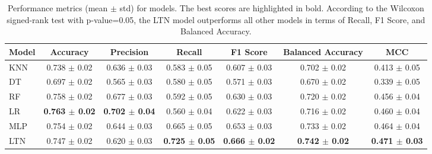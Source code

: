 \begin{table*}[]
    \centering
    \begin{adjustbox}{max width=\textwidth}
        \begin{tabular}{|l|c|c|c|c|c|c|}
            \hline
            \textbf{Model} & \textbf{Accuracy} & \textbf{Precision} & \textbf{Recall} & \textbf{F1 Score} & \textbf{Balanced Accuracy} & \textbf{MCC} \\
            \hline
            \gls{KNN}  & 0.738 $\pm$  0.02 & 0.636 $\pm$  0.03 & 0.583 $\pm$  0.05 & 0.607 $\pm$  0.03 & 0.702 $\pm$  0.02 & 0.413 $\pm$  0.05 \\
            \hline
            \gls{DT}   & 0.697 $\pm$  0.02 & 0.565 $\pm$  0.03 & 0.580 $\pm$  0.05 & 0.571 $\pm$  0.03 & 0.670 $\pm$  0.02 & 0.339 $\pm$  0.05 \\
            \hline
            \gls{RF}   & 0.758 $\pm$  0.02 & 0.677 $\pm$  0.03 & 0.592 $\pm$  0.05 & 0.630 $\pm$  0.03 & 0.720 $\pm$  0.02 & 0.456 $\pm$  0.04 \\
            \hline
            \gls{LR}   & \textbf{0.763 $\pm$  0.02 }& \textbf{0.702 $\pm$  0.04} & 0.560 $\pm$  0.04 & 0.622 $\pm$  0.03 & 0.716 $\pm$  0.02 & 0.460 $\pm$  0.04 \\
            \hline
            \gls{MLP}  & 0.754 $\pm$  0.02 & 0.644 $\pm$  0.03 & 0.665 $\pm$  0.05 & 0.653 $\pm$  0.03 & 0.733 $\pm$  0.02 & 0.464 $\pm$  0.04 \\
            \hline
            \gls{LTN}  & 0.747 $\pm$  0.02 & 0.620 $\pm$  0.03 & \textbf{0.725 $\pm$  0.05} & \textbf{0.666 $\pm$  0.02} & \textbf{0.742 $\pm$  0.02} & \textbf{0.471 $\pm$  0.03} \\
            \hline
        \end{tabular}
    \end{adjustbox}
    \caption[Performance metrics for  models on the  Dataset]{
      Performance metrics (mean $\pm$ std) for  models.
      The best scores are highlighted in bold.
      According to the Wilcoxon signed-rank test with p-value=0.05, the \gls{LTN} model outperforms all other models in terms of Recall, F1 Score, and Balanced Accuracy.
    }
    \label{tab:ski-diabetes-performance-metrics}
\end{table*}